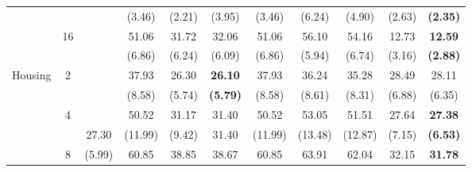 \documentclass[letterpaper]{article} %
\begin{document}
\begin{table}[!t]
{\begin{tabular}{clcccccccc|cc}
\multicolumn{2}{c}{}                             &                       &                             & (3.46)                    & (2.21)                    & (3.95)                      & (3.46)                    & (6.24)                    & (4.90)                      & (2.63)              & \textbf{(2.35)}       \\
\multicolumn{2}{c}{}                             & \multirow{2}{*}{16}   &                             & 51.06                     & 31.72                     & 32.06                       & 51.06                     & 56.10                     & 54.16                       & 12.73               & \textbf{12.59}        \\
\multicolumn{2}{c}{}                             &                       &                             & (6.86)                    & (6.24)                    & (6.09)                      & (6.86)                    & (5.94)                    & (6.74)                      & (3.16)              & \textbf{(2.88)}       \\ \hline
\multicolumn{2}{c}{\multirow{8}{*}{Housing}}     & \multirow{2}{*}{2}    &                             & 37.93                     & 26.30                     & \textbf{26.10}              & 37.93                     & 36.24                     & 35.28                       & 28.49               & 28.11                 \\
\multicolumn{2}{c}{}                             &                       &                             & (8.58)                    & (5.74)                    & \textbf{(5.79)}             & (8.58)                    & (8.61)                    & (8.31)                      & (6.88)              & (6.35)               \\
\multicolumn{2}{c}{}                             & \multirow{2}{*}{4}    &                             & 50.52                     & 31.17                     & 31.40                       & 50.52                     & 53.05                     & 51.51                       & 27.64               & \textbf{27.38}        \\
\multicolumn{2}{c}{}                             &                       & 27.30                       & (11.99)                   & (9.42)                    & 31.40                       & (11.99)                   & (13.48)                   & (12.87)                     & (7.15)              & \textbf{(6.53)}       \\
\multicolumn{2}{c}{}                             & \multirow{2}{*}{8}    & (5.99)                      & 60.85                     & 38.85                     & 38.67                       & 60.85                     & 63.91                     & 62.04                       & 32.15               & \textbf{31.78}        \\

\end{tabular}}
\end{table}
\end{document}
